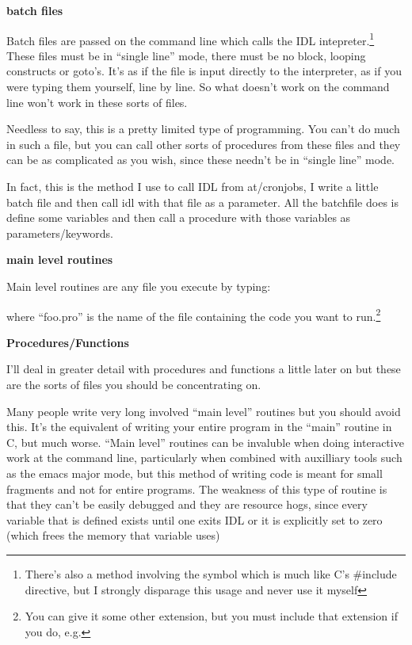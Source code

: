     \bi
	\item \textbf{batch files}

	Batch files are passed on the command line which calls the IDL
        intepreter.\footnote{There's also a method involving the \@
        symbol which is much like C's \#include directive, but I
        strongly disparage this usage and never use it myself} These
        files must be in ``single line'' mode, there must be no block,
        looping constructs or goto's. It's as if the file is input
        directly to the interpreter, as if you were typing them
        yourself, line by line.  So what doesn't work on the command
        line won't work in these sorts of files.

	Needless to say, this is a pretty limited type of
        programming. You can't do much in such a file, but you can
        call other sorts of procedures from these files and they can
        be as complicated as you wish, since these needn't be in
        ``single line'' mode.

	In fact, this is the method I use to call IDL from
        at/cronjobs, I write a little batch file and then call idl
        with that file as a parameter. All the batchfile does is
        define some variables and then call a procedure with those
        variables as parameters/keywords.

  
	\item \textbf{main level routines}

        Main level routines are any file you execute by typing:


        where ``foo.pro'' is the name of the file containing the code
        you want to run.\footnote{You can give it some other
        extension, but you must include that extension if you do,
        e.g.  }

	\item \textbf{Procedures/Functions}
	
	I'll deal in greater detail with procedures and functions a
        little later on but these are the sorts of files you should be
        concentrating on.

    \ei

    Many people write very long involved ``main level'' routines but
    you should avoid this. It's the equivalent of writing your entire
    program in the ``main'' routine in C, but much worse. ``Main
    level'' routines can be invaluble when doing interactive work at
    the command line, particularly when combined with auxilliary tools
    such as the emacs  major mode, but this method
    of writing code is meant for small fragments and not for entire
    programs. The weakness of this type of routine is that they can't
    be easily debugged and they are resource hogs, since every
    variable that is defined exists until one exits IDL or it is
    explicitly set to zero (which frees the memory that variable uses)

